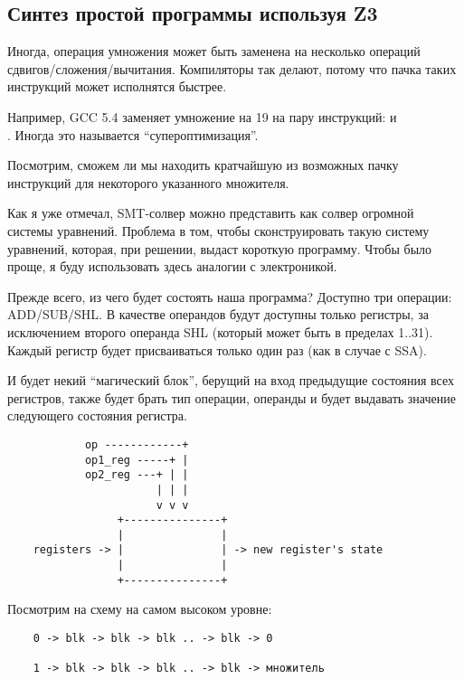 \subsection{Синтез простой программы используя Z3}
\label{synth_mult}                                                                                                                

Иногда, операция умножения может быть заменена на несколько операций сдвигов/сложения/вычитания.
Компиляторы так делают, потому что пачка таких инструкций может исполнятся быстрее.

Например, GCC 5.4 заменяет умножение на 19 на пару инструкций:  и\\
.
Иногда это называется ``супероптимизация''.

Посмотрим, сможем ли мы находить кратчайшую из возможных пачку инструкций для некоторого указанного множителя.

Как я уже отмечал, SMT-солвер можно представить как солвер огромной системы уравнений.
Проблема в том, чтобы сконструировать такую систему уравнений, которая, при решении, выдаст короткую программу.
Чтобы было проще, я буду использовать здесь аналогии с электроникой.

Прежде всего, из чего будет состоять наша программа? Доступно три операции: ADD/SUB/SHL.
В качестве операндов будут доступны только регистры, за исключением второго операнда SHL
(который может быть в пределах 1..31).
Каждый регистр будет присваиваться только один раз (как в случае с \ac{SSA}).

И будет некий ``магический блок'', берущий на вход предыдущие состояния всех регистров, также будет брать тип операции,
операнды и будет выдавать значение следующего состояния регистра.

\begin{lstlisting}
	        op ------------+
	        op1_reg -----+ |
	        op2_reg ---+ | |
	                   | | |
	                   v v v
	             +---------------+
	             |               |
	registers -> |               | -> new register's state
	             |               |
	             +---------------+
\end{lstlisting}

Посмотрим на схему на самом высоком уровне:

\begin{lstlisting}
	0 -> blk -> blk -> blk .. -> blk -> 0

	1 -> blk -> blk -> blk .. -> blk -> множитель
\end{lstlisting}

